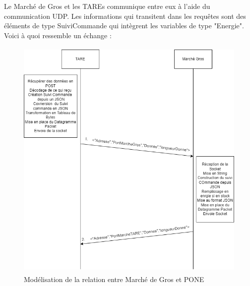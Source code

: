 Le Marché de Gros et les TAREs communique entre eux à l'aide du communication UDP. Les informations qui transitent dans les requêtes sont des éléments de type SuiviCommande qui intègrent les variables de type "Energie". Voici à quoi ressemble un échange :

\begin{figure}[h]
    \centering
    \includegraphics[width=140mm, height=120mm]{images/TAREMG.png}
    \caption{Modélisation de la relation entre Marché de Gros et PONE}
    \label{img:mesh19}
\end{figure}
\newpage
